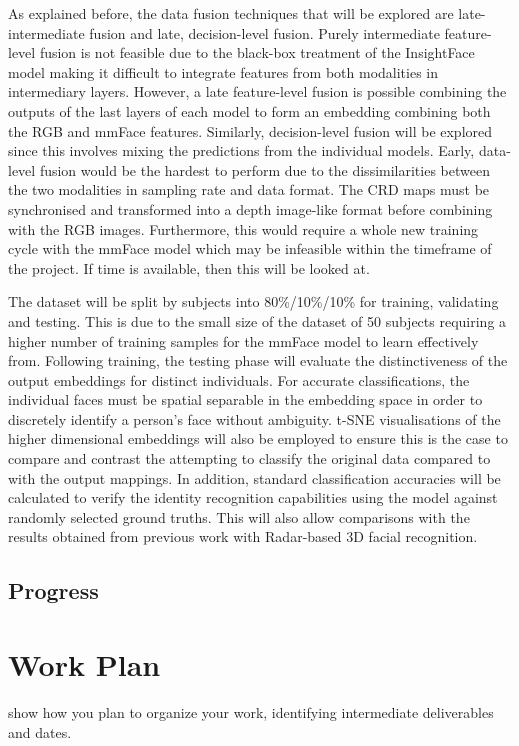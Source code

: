 \documentclass{interim}
\begin{document}
As explained before, the data fusion techniques that will be explored are late-intermediate fusion and late, decision-level fusion. Purely intermediate feature-level fusion is not feasible due to the black-box treatment of the InsightFace model making it difficult to integrate features from both modalities in intermediary layers. However, a late feature-level fusion is possible combining the outputs of the last layers of each model to form an embedding combining both the RGB and mmFace features. Similarly, decision-level fusion will be explored since this involves mixing the predictions from the individual models. Early, data-level fusion would be the hardest to perform due to the dissimilarities between the two modalities in sampling rate and data format. The CRD maps must be synchronised and transformed into a depth image-like format before combining with the RGB images. Furthermore, this would require a whole new training cycle with the mmFace model which may be infeasible within the timeframe of the project. If time is available, then this will be looked at.

The dataset will be split by subjects into 80\%/10\%/10\% for training, validating and testing. This is due to the small size of the dataset of 50 subjects requiring a higher number of training samples for the mmFace model to learn effectively from. Following training, the testing phase will evaluate the distinctiveness of the output embeddings for distinct individuals. For accurate classifications, the individual faces must be spatial separable in the embedding space in order to discretely identify a person's face without ambiguity. t-SNE visualisations \cite{van2008visualizing} of the higher dimensional embeddings will also be employed to ensure this is the case to compare and contrast the attempting to classify the original data compared to with the output mappings. In addition, standard classification accuracies will be calculated to verify the identity recognition capabilities using the model against randomly selected ground truths. This will also allow comparisons with the results obtained from previous work with Radar-based 3D facial recognition.


\subsection{Progress}


\section{Work Plan}
show how you plan to organize your work, identifying intermediate deliverables and dates.



\end{document}
